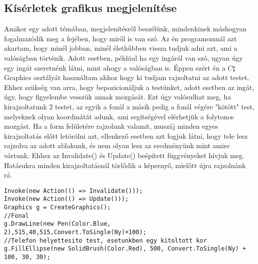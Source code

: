 \documentclass{thesis-ekf}
\theoremstyle{definition}
\theoremstyle{remark}
\begin{document}
\subsection{Kísérletek grafikus megjelenítése}
Amikor egy adott témában, megjelenítésről beszélünk, mindenkinek máshogyan fogalmazódik meg a fejében, hogy miről is van szó. Az én programomnál azt akartam, hogy minél jobban, minél élethűbben vissza tudjuk adni azt, ami a valóságban történik. Adott esetben, például ha egy ingáról van szó, ugyan úgy egy ingát szeretnénk látni, mint ahogy a valóságban is. Éppen ezért én a $C\sharp$ Graphics osztályát használtam ahhoz hogy ki tudjam rajzoltatni az adott testet. Ehhez szükség van arra, hogy bepozicionáljuk a testünket, adott esetben az ingát, úgy, hogy figyelembe vesszük annak mozgását. Ezt úgy valósulhat meg, ha kirajzoltatunk 2 testet, az egyik a fonál a másik pedig a fonál végére "kötött" test, melyeknek olyan koordinátát adunk, ami segítségével elérhetjük a folytonos mozgást. Ha a form felületére rajzolunk valamit, muszáj minden egyes kirajzoltatás előtt letörölni azt, ellenkező esetben azt fogjuk látni, hogy tele lesz rajzolva az adott ablakunk, és nem olyan lesz az eredményünk mint amire vártunk. Ehhez az Invalidate() és Update() beépített függvényeket hívjuk meg. Hatásukra minden kirajzoltatásnál törlődik a képernyő, mielőtt újra rajzolnánk rá.
\begin{lstlisting}
Invoke(new Action(() => Invalidate()));
Invoke(new Action(() => Update()));
Graphics g = CreateGraphics();
//Fonal
g.DrawLine(new Pen(Color.Blue, 2),515,40,515,Convert.ToSingle(Ny)+100);
//Telefon helyettesito test, esetunkben egy kitoltott kor
g.FillEllipse(new SolidBrush(Color.Red), 500, Convert.ToSingle(Ny) + 100, 30, 30);
\end{lstlisting}
\end{document}

